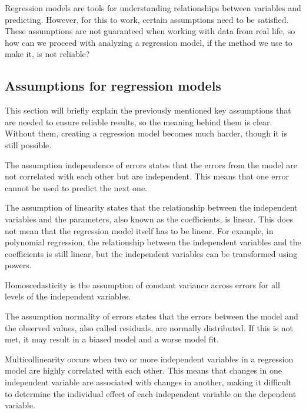 Regression models are tools for understanding relationships between variables and predicting. However, for this to work, certain assumptions need to be satisfied. 
These assumptions are not guaranteed when working with data from real life, so how can we proceed with analyzing a regression model, if the method we use to make it, is not reliable?


\subsection{Assumptions for regression models}

\noindent This section will briefly explain the previously mentioned key assumptions that are needed to ensure reliable results, so the meaning behind them is clear. Without them, creating a regression model becomes much harder, though it is still possible.  \newline

\noindent The assumption independence of errors states that the errors from the model are not correlated with each other but are independent. This means that one error cannot be used to predict the next one. \newline


\noindent The assumption of linearity states that the relationship between the independent variables and the parameters, also known as the coefficients, is linear. This does not mean that the regression model itself has to be linear. For example, in polynomial regression, the relationship between the independent variables and the coefficients is still linear, but the independent variables can be transformed using powers.\newline


\noindent Homoscedasticity is the assumption of constant variance across errors for all levels of the independent variables. \newline

\noindent The assumption normality of errors states that the errors between the model and the observed values, also called residuals, are normally distributed. If this is not met, it may result in a biased model and a worse model fit. \newline


\noindent Multicollinearity occurs when two or more independent variables in a regression model are highly correlated with each other. This means that changes in one independent variable are associated with changes in another, making it difficult to determine the individual effect of each independent variable on the dependent variable. \newline

